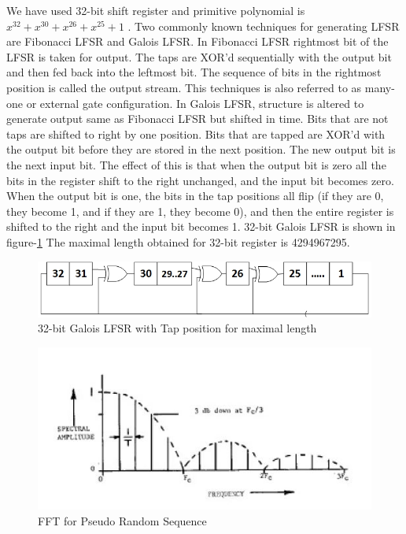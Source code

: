 \documentclass[a4paper,12pt]{article}
\begin{document}
We have used 32-bit shift register and primitive polynomial is $x^{32}+x^{30}+x^{26}+x^{25}+1$ \cite{lfsr_table}. Two commonly known techniques for generating LFSR are Fibonacci LFSR and Galois LFSR\cite{lfsr_wiki}. In Fibonacci LFSR rightmost bit of the LFSR is taken for output. The taps are XOR'd sequentially with the output bit and then fed back into the leftmost bit. The sequence of bits in the rightmost position is called the output stream. This techniques is also referred to as many-one or external gate configuration. In Galois LFSR, structure is altered to generate output same as Fibonacci LFSR but shifted in time. Bits that are not taps are shifted to right by one position. Bits that are tapped are XOR'd with the output bit before they are stored in the next position. The new output bit is the next input bit. The effect of this is that when the output bit is zero all the bits in the register shift to the right unchanged, and the input bit becomes zero. When the output bit is one, the bits in the tap positions all flip (if they are 0, they become 1, and if they are 1, they become 0), and then the entire register is shifted to the right and the input bit becomes 1. 32-bit Galois LFSR is shown in figure-\ref{fig:galois} The maximal length obtained for 32-bit register is 4294967295.

\begin{figure}[!ht]
	\centering
	\includegraphics[scale=0.6]{galois.jpg}
	\caption{32-bit Galois LFSR with Tap position for maximal length}
	\label{fig:galois}
\end{figure}


\begin{figure}[!ht]
	\centering
	\includegraphics[scale=0.8]{PRS_fft}
	\caption{FFT for Pseudo Random Sequence}
	\label{fig:fft}
\end{figure}
\end{document}
